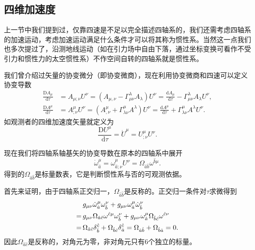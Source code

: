 \documentclass[11pt, a4paper, oneside, onecolumn]{ctexart}
\numberwithin{equation}{subsection}
\begin{document}
\subsection{四维加速度}
上一节中我们提到过，仅靠四速是不足以完全描述四轴系的，我们还需考虑四轴系的加速运动，考虑加速运动满足什么条件才可以将其称为惯性系。当然这一点我们也多次提过了，沿测地线运动（如在引力场中自由下落，通过坐标变换可看作不受引力和惯性力的太空惯性系）不作空间自转的四轴系就是惯性系。

我们曾介绍过矢量的协变微分（即协变微商），现在利用协变微商和四速可以定义协变导数
\begin{align}
\frac{\mathrm{D}A_{\mu}}{\mathrm{d}\tau}&=A_{\mu;\nu}U^{\nu}=\left(A_{\mu,\nu}-\Gamma_{\mu\nu}^{\lambda}A_{\lambda}\right)U^{\nu}=\frac{\mathrm{d}A_{\mu}}{\mathrm{d}\tau}-\Gamma^{\lambda}_{\mu\nu}A_{\lambda}U^{\nu},\\
\frac{\mathrm{D}A^{\mu}}{\mathrm{d}\tau}&=A^{\mu}_{;\nu}U^{\nu}=\left(A^{\mu}_{,\nu}+\Gamma^{\mu}_{\lambda\nu}A^{\lambda}\right)U^{\nu}=\frac{\mathrm{d}A^{\mu}}{\mathrm{d}\tau}+\Gamma^{\mu}_{\lambda\nu}A^{\lambda}U^{\nu}.
\end{align}
如观测者的四维加速度矢量就定义为
\begin{equation}
\dfrac{\mathrm{D}U^{\mu}}{\mathrm{d}\tau}=\dot{U}^{\mu}=U^{\mu}_{;\nu}U^{\nu}.
\end{equation}

现在我们将四轴系轴基矢的协变导数在原本的四轴系中展开
\begin{equation}
\dot{\omega}^{\mu}_{\hat{a}}=\omega^{\mu}_{\hat{a};\nu}U^{\nu}=\Omega_{\hat{a}\hat{b}}\omega^{\hat{b}\mu}.
\end{equation}
得到的$\Omega_{\hat{a}\hat{b}}$是标量数表，它是判断惯性系与否的可观测依据。

首先来证明，由于四轴系正交归一，$\Omega_{\hat{a}\hat{b}}$是反称的。正交归一条件对$\tau$求微得到
\begin{align}
&g_{\mu\nu}\dot{\omega}^{\mu}_{\hat{a}}\omega^{\nu}_{\hat{b}}+g_{\mu\nu}\omega^{\mu}_{\hat{a}}\dot{\omega}^{\nu}_{\hat{b}}\notag\\
=\,&g_{\mu\nu}\Omega_{\hat{a}\hat{c}}\omega^{\hat{c}\mu}\omega^{\nu}_{\hat{b}}+g_{\mu\nu}\omega^{\mu}_{\hat{a}}\Omega_{\hat{b}\hat{c}}\omega^{\hat{c}\nu}\notag\\
=\,&\Omega_{\hat{a}\hat{c}}\delta{}^{\hat{c}}_{\hat{b}}+\Omega_{\hat{b}\hat{c}}\delta{}^{\hat{c}}_{\hat{a}}=\Omega_{\hat{a}\hat{b}}+\Omega_{\hat{b}\hat{a}}=0.
\end{align}
因此$\Omega_{\hat{a}\hat{c}}$是反称的，对角元为零，非对角元只有6个独立的标量。
\end{document}
